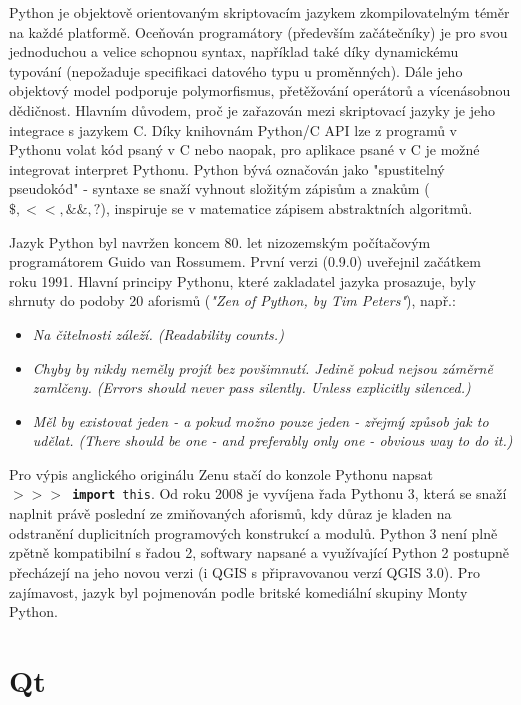 Python je objektově orientovaným skriptovacím jazykem zkompilovatelným téměr na každé platformě. Oceňován programátory (především začátečníky) je pro svou jednoduchou a velice schopnou syntax, například také díky dynamickému typování (nepožaduje specifikaci datového typu u proměnných). Dále jeho objektový model podporuje polymorfismus, přetěžování operátorů a vícenásobnou dědičnost. Hlavním důvodem, proč je zařazován mezi skriptovací jazyky je jeho integrace s jazykem C. Díky knihovnám Python/C API lze z programů v Pythonu volat kód psaný v C nebo naopak, pro aplikace psané v C je možné integrovat interpret Pythonu. %
Python bývá označován jako "spustitelný pseudokód" - syntaxe se snaží vyhnout složitým zápisům a znakům ($\$, <<, \&\&, ?$), inspiruje se v matematice zápisem abstraktních algoritmů.%

Jazyk Python byl navržen koncem 80. let nizozemským počítačovým programátorem Guido van Rossumem. První verzi (0.9.0) uveřejnil začátkem roku 1991. Hlavní principy Pythonu, které zakladatel jazyka prosazuje, byly shrnuty do podoby 20 aforismů (\textit{"Zen of Python, by Tim Peters"}), např.:

\begin{itemize}

	\item
		\textit{Na čitelnosti záleží. (Readability counts.)} 	
			
	\item
		\textit{Chyby by nikdy neměly projít bez povšimnutí. Jedině pokud nejsou záměrně zamlčeny. (Errors should never pass silently. Unless explicitly silenced.)}
		
	\item
		\textit{Měl by existovat jeden - a pokud možno pouze jeden - zřejmý způsob jak to udělat. (There should be one - and preferably only one - obvious way to do it.)}
\end{itemize}  

Pro výpis anglického originálu Zenu stačí do konzole Pythonu napsat \\ \texttt{$>>>$~\textbf{import}~this}. Od roku 2008 je vyvíjena řada Pythonu 3, která se snaží naplnit právě poslední ze zmiňovaných aforismů, kdy důraz je kladen na odstranění duplicitních programových konstrukcí a modulů. Python 3 není plně zpětně kompatibilní s řadou 2, softwary napsané a využívající Python 2 postupně přecházejí na jeho novou verzi (i QGIS s připravovanou verzí QGIS 3.0). Pro zajímavost, jazyk byl pojmenován podle britské komediální skupiny Monty Python.  %


\section{Qt}

